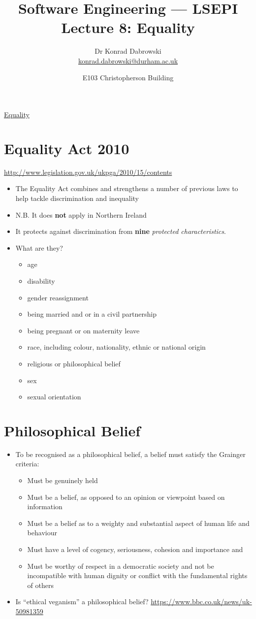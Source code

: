 \documentclass{article}
\title{Software Engineering --- LSEPI Lecture 8: Equality}
\author{Dr Konrad Dabrowski\\
\href{mailto://konrad.dabrowski@durham.ac.uk}{konrad.dabrowski@durham.ac.uk}
}
\date{E103 Christopherson Building}
\begin{document}
\begin{center}
	\underline{\huge Equality}
\end{center}




\section{Equality Act 2010}
\url{http://www.legislation.gov.uk/ukpga/2010/15/contents}
\begin{itemize}
\item The Equality Act combines and strengthens a number of previous laws to help tackle discrimination and inequality
\item N.B. It does {\bf not} apply in Northern Ireland
\item It protects against discrimination from {\bf nine} {\em protected characteristics}.
\item What are they?

\begin{itemize}
\item age
\item disability
\item gender reassignment
\item being married and or in a civil partnership
\item being pregnant or on maternity leave
\item race, including colour, nationality, ethnic or national origin
\item religious or philosophical belief
\item sex
\item sexual orientation
\end{itemize}
\end{itemize}



\section{Philosophical Belief}
\begin{itemize}
\item To be recognised as a philosophical belief, a belief must satisfy the Grainger criteria:

\begin{itemize}
\item Must be genuinely held
\item Must be a belief, as opposed to an opinion or viewpoint based on information
\item Must be a belief as to a weighty and substantial aspect of human life and behaviour
\item Must have a level of cogency, seriousness, cohesion and importance and
\item Must be worthy of respect in a democratic society and not be incompatible with human dignity or conflict with the fundamental rights of others
\end{itemize}
\item Is ``ethical veganism'' a philosophical belief?
\url{https://www.bbc.co.uk/news/uk-50981359}
\end{itemize}
\end{document}
